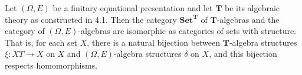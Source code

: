Let $(\Omega, E)$ be a finitary equational presentation and let $\mathbf{T}$ be its algebraic theory as constructed in 4.1. Then the category $\mathbf{Set}^{\mathbf{T}}$ of $\mathbf{T}$-algebras and the category of $(\Omega, E)$-algebras are isomorphic as categories of sets with structure. That is, for each set $X$, there is a natural bijection between $\mathbf{T}$-algebra structures $\xi: XT \longrightarrow X$ on $X$ and $(\Omega, E)$-algebra structures $\delta$ on $X$, and this bijection respects homomorphisms.
